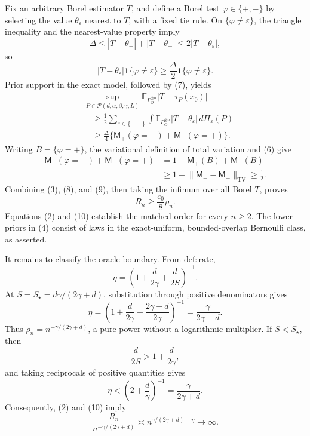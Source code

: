 Fix an arbitrary Borel estimator \(T\), and define a Borel test \(\varphi\in\{+,-\}\) by selecting the value \(\theta_\varepsilon\) nearest to \(T\), with a fixed tie rule.  On \(\{\varphi\ne\varepsilon\}\), the triangle inequality and the nearest-value property imply
\[
 \Delta\le|T-\theta_+|+|T-\theta_-|
 \le2|T-\theta_\varepsilon|,
\]
so
\[
 |T-\theta_\varepsilon|\mathbf 1\{\varphi\ne\varepsilon\}
 \ge\frac\Delta2\mathbf 1\{\varphi\ne\varepsilon\}.         \tag{7}
\]
Prior support in the exact model, followed by (7), yields
\[
\begin{aligned}
 &\sup_{P\in\mathcal P(d,\alpha,\beta,\gamma,L)}
 \mathbb E_{P_O^{\otimes n}}|T-\tau_P(x_0)|\\
 &\quad\ge\frac12\sum_{\varepsilon\in\{+,-\}}
 \int\mathbb E_{P_O^{\otimes n}}|T-\theta_\varepsilon|\,d\Pi_\varepsilon(P)\\
 &\quad\ge\frac\Delta4
 \{\mathsf M_+(\varphi=-)+\mathsf M_-(\varphi=+)\}.           \tag{8}
\end{aligned}
\]
Writing \(B=\{\varphi=+\}\), the variational definition of total variation and (6) give
\[
\begin{aligned}
 \mathsf M_+(\varphi=-)+\mathsf M_-(\varphi=+)
 &=1-\mathsf M_+(B)+\mathsf M_-(B)\\
 &\ge1-\lVert\mathsf M_+-\mathsf M_-\rVert_{\mathrm{TV}}
 \ge\frac12.                                                     \tag{9}
\end{aligned}
\]
Combining (3), (8), and (9), then taking the infimum over all Borel \(T\), proves
\[
 R_n\ge\frac{c_0}{8}\rho_n.                                   \tag{10}
\]
Equations (2) and (10) establish the matched order for every \(n\ge2\).  The lower priors in (4) consist of laws in the exact-uniform, bounded-overlap Bernoulli class, as asserted.

It remains to classify the oracle boundary.  From \(\mathrm{def:rate}\),
\[
 \eta=\left(1+\frac d{2\gamma}+\frac d{2S}\right)^{-1}.
\]
At \(S=S_\star=d\gamma/(2\gamma+d)\), substitution through positive denominators gives
\[
 \eta=\left(1+\frac d{2\gamma}+\frac{2\gamma+d}{2\gamma}\right)^{-1}
 =\frac\gamma{2\gamma+d}.                                      \tag{11}
\]
Thus \(\rho_n=n^{-\gamma/(2\gamma+d)}\), a pure power without a logarithmic multiplier.  If \(S<S_\star\), then
\[
 \frac d{2S}>1+\frac d{2\gamma},
\]
and taking reciprocals of positive quantities gives
\[
 \eta<\left(2+\frac d\gamma\right)^{-1}
 =\frac\gamma{2\gamma+d}.                                      \tag{12}
\]
Consequently, (2) and (10) imply
\[
 \frac{R_n}{n^{-\gamma/(2\gamma+d)}}
 \asymp n^{\gamma/(2\gamma+d)-\eta}\longrightarrow\infty.    \tag{13}
\]

